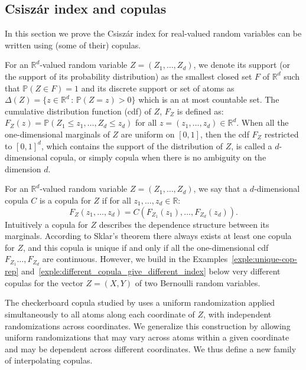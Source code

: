 \documentclass[12pt]{article}
\renewcommand{\P}{{\mathbb P}}
\newcommand{\R}{{\mathbb R}}
\theoremstyle{plain}
\theoremstyle{remark}
\begin{document}
\subsection{Csiszár index and copulas}
\label{sec:copula}

In this section we prove the Csiszár index  for real-valued random variables can be
written using (some of their) copulas.


For an $\R^d$-valued  random variable $Z=(Z_1, \ldots,  Z_d)$, we denote
its  support (or  the support  of its  probability distribution)  as the
smallest  closed set  $F$ of  $\R^d$ such  that $\P(Z\in  F)=1$ and  its
discrete  support or set of atoms as  $\Delta(Z)=\{z\in  \R^d  \, \colon\,  \P(Z=z)>0\}$
which is an at most countable set.
The cumulative distribution function (cdf) 
of          $Z$,          $F_Z$         is          defined          as:
$F_Z(z)=\P(Z_1\leq    z_1,   \ldots,    Z_d   \leq    z_d)$   for    all
$z=(z_1, \ldots, z_d)\in \R^d$.
When all the one-dimensional marginals
of  $Z$  are uniform  on  $[0,1]$,  then  the  cdf $F_Z$  restricted  to
$[0,1]^d$, which  contains the  support of the  distribution of  $Z$, is
called  a $d$-dimensional  copula, or  simply  copula when  there is  no
ambiguity  on the  dimension  $d$. 

For  an  $\R^d$-valued  random
variable $Z=(Z_1,  \ldots, Z_d)$, we  say that a  $d$-dimensional copula
$C$ is a copula for $Z$ if for all $z_1, \dots ,z_d \in \R$:
\begin{equation}
\label{eq:definition_copula_vector}
    F_Z(z_1, \dots, z_d) = C(F_{Z_1}(z_1) , \dots, F_{Z_d }(z_d)).
\end{equation}
Intuitively a copula  for $Z$ describes the  dependence structure between
its marginals. According to Sklar's theorem there always exists at least
one copula  for $Z$, and this  copula is unique  if and only if  all the
one-dimensional  cdf   $F_{Z_1}\ldots,  F_{Z_d}$  are   continuous.  However, we build in the 
Examples~\ref{exple:unique-cop-rep} and~\ref{exple:different_copula_give_different_index}
below very different copulas for the vector $Z=(X,Y)$ of two Bernoulli random variables.  



The checkerboard copula studied by \cite{lin2025checkerboard} uses a uniform randomization applied simultaneously to all atoms along each coordinate of $Z$, with independent randomizations across coordinates. We generalize this construction by allowing uniform randomizations that may vary across atoms within a given coordinate and may be dependent across different coordinates. We thus define a new family of interpolating copulas.
\end{document}
